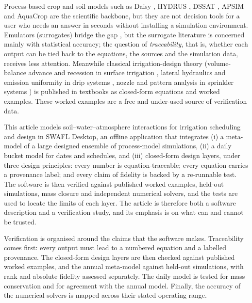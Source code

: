 \documentclass[preprint,12pt]{elsarticle}
\begin{document}
Process-based crop and soil models such as Daisy \cite{Hansen1991,Hansen2012,Abrahamsen2000,Holbak2026}, HYDRUS \cite{Simunek2008,Simunek2016}, DSSAT \cite{Jones2003}, APSIM \cite{Keating2003} and AquaCrop \cite{Steduto2009} are the scientific backbone, but they are not decision tools for a user who needs an answer in seconds without installing a simulation environment. Emulators (surrogates) bridge the gap \cite{Razavi2012,Asher2015,Sacks1989,Kennedy2001}, but the surrogate literature is concerned mainly with statistical accuracy; the question of \emph{traceability}, that is, whether each output can be tied back to the equations, the sources and the simulation data, receives less attention. Meanwhile classical irrigation-design theory (volume-balance advance and recession in surface irrigation \cite{Walker1987,Elliott1982}, lateral hydraulics and emission uniformity in drip systems \cite{KellerKarmeli1974,Keller1990,Scaloppi1993}, nozzle and pattern analysis in sprinkler systems \cite{Christiansen1942,Keller1990,Playan2005}) is published in textbooks as closed-form equations and worked examples. These worked examples are a free and under-used source of verification data.

This article models soil--water--atmosphere interactions for irrigation scheduling and design in SWAFL Desktop, an offline application that integrates (i) a meta-model of a large designed ensemble of process-model simulations, (ii) a daily bucket model for dates and schedules, and (iii) closed-form design layers, under three design principles: every number is equation-traceable; every equation carries a provenance label; and every claim of fidelity is backed by a re-runnable test. The software is then verified against published worked examples, held-out simulations, mass closure and independent numerical solvers, and the tests are used to locate the limits of each layer. The article is therefore both a software description and a verification study, and its emphasis is on what can and cannot be trusted.

Verification is organised around the claims that the software makes. Traceability comes first: every output must lead to a numbered equation and a labelled provenance. The closed-form design layers are then checked against published worked examples, and the annual meta-model against held-out simulations, with rank and absolute fidelity assessed separately. The daily model is tested for mass conservation and for agreement with the annual model. Finally, the accuracy of the numerical solvers is mapped across their stated operating range.
\end{document}
